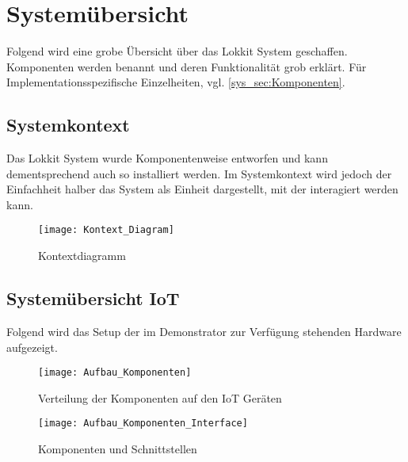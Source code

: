 \section{Systemübersicht}
Folgend wird eine grobe Übersicht über das Lokkit System geschaffen. Komponenten werden benannt und deren Funktionalität grob erklärt. Für Implementationsspezifische Einzelheiten, vgl. \ref{sys_sec:Komponenten}.

\subsection{Systemkontext}
Das Lokkit System wurde Komponentenweise entworfen und kann dementsprechend auch so installiert werden. Im Systemkontext wird jedoch der Einfachheit halber das System als Einheit dargestellt, mit der interagiert werden kann.
\begin{figure}[H]
\centering
\texttt{[image: Kontext\_Diagram]}
\caption{Kontextdiagramm}
\label{fig:Kontextdiagramm}
\end{figure}

\subsection{Systemübersicht IoT}
\label{subsec:Setup_IoT}
Folgend wird das Setup der im Demonstrator zur Verfügung stehenden Hardware aufgezeigt.

\begin{figure}[H]
\centering
\texttt{[image: Aufbau\_Komponenten]}
\caption{Verteilung der Komponenten auf den IoT Geräten}
\label{fig:Aufbau Komponenten}
\end{figure}

\begin{figure}[H]
\centering
\texttt{[image: Aufbau\_Komponenten\_Interface]}
\caption{Komponenten und Schnittstellen}
\label{fig:Komponenten und Schnittstellen}
\end{figure}
